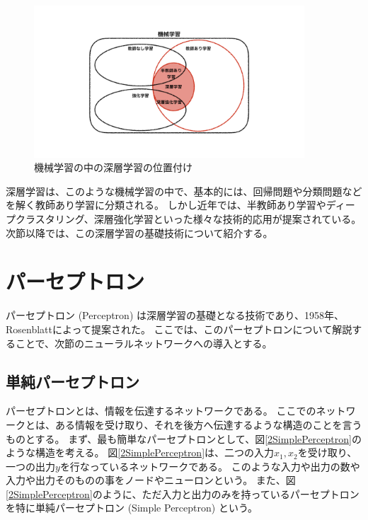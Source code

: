 \begin{figure}[h]
 \centering
 \includegraphics[width=0.9\textwidth]{Figure/2DeepLearning/1MachineLearning.png}
 \caption{機械学習の中の深層学習の位置付け}
 \label{1MachineLearning}
\end{figure}

深層学習は、このような機械学習の中で、基本的には、回帰問題や分類問題などを解く教師あり学習に分類される。
しかし近年では、半教師あり学習やディープクラスタリング、深層強化学習といった様々な技術的応用が提案されている。
次節以降では、この深層学習の基礎技術について紹介する。


\section{パーセプトロン} \label{DL:Perceptron}

パーセプトロン (Perceptron\cite{}) は深層学習の基礎となる技術であり、1958年、Rosenblattによって提案された。\cite{PerceptronPaper}
ここでは、このパーセプトロンについて解説することで、次節のニューラルネットワークへの導入とする。


\subsection{単純パーセプトロン} \label{DL:Percep:SimplePerceptron}

パーセプトロンとは、情報を伝達するネットワークである。
ここでのネットワークとは、ある情報を受け取り、それを後方へ伝達するような構造のことを言うものとする。
まず、最も簡単なパーセプトロンとして、図\ref{2SimplePerceptron}のような構造を考える。
図\ref{2SimplePerceptron}は、二つの入力$x_1,x_2$を受け取り、一つの出力$y$を行なっているネットワークである。
このような入力や出力の数や入力や出力そのものの事をノードやニューロンという。
また、図\ref{2SimplePerceptron}のように、ただ入力と出力のみを持っているパーセプトロンを特に単純パーセプトロン (Simple Perceptron) という。

